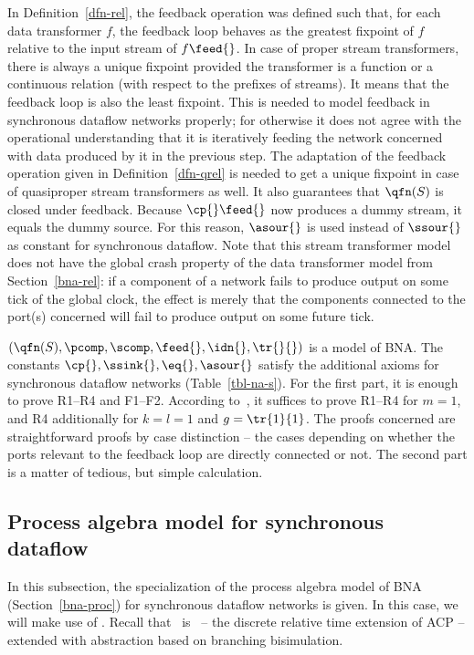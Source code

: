 \documentclass[fleqn]{llncs}
\begin{document}
In Definition~\ref{dfn-rel}, the feedback operation was defined such
that, for each data transformer $f$, the feedback loop behaves as the
greatest fixpoint of $f$ relative to the input stream of $f \feed{}$.
In case of proper stream transformers, there is always a unique
fixpoint provided the transformer is a function or a continuous
relation (with respect to the prefixes of streams).
It means that the feedback loop is also the least fixpoint.
This is needed to model feedback in synchronous dataflow networks
properly; for otherwise it does not agree with the operational
understanding that it is iteratively feeding the network concerned with
data produced by it in the previous step.
The adaptation of the feedback operation given in
Definition~\ref{dfn-qrel} is needed to get a unique fixpoint in
case of quasiproper stream transformers as well.
It also guarantees that $\qfn(S)$ is closed under feedback.
Because $\cp{} \feed{}$ now produces a dummy stream, it equals the
dummy source.
For this reason, $\asour{}$ is used instead of $\ssour{}$ as constant
for synchronous dataflow.
Note that this stream transformer model does not have the global crash
property of the data transformer model from Section~\ref{bna-rel}: if a
component of a network fails to produce output on some tick of the
global clock, the effect is merely that the components connected to the
port(s) concerned will fail to produce output on some future tick.


\bthm
$(\qfn(S),\pcomp,\scomp,\feed{},\idn{},\tr{}{})$ is a model of BNA.
The constants $\cp{},\ssink{},\eq{},\asour{}$ satisfy the additional
axioms for synchronous dataflow networks (Table~\ref{tbl-na-s}).
\ethm
\bproof
For the first part, it is enough to prove R1--R4 and F1--F2.
According to~\cite{CS88,CS89}, it suffices to prove R1--R4 for $m = 1$,
and R4 additionally for $k = l = 1$ and $g = \tr{1}{1}$.
The proofs concerned are straightforward proofs by case distinction --
the cases depending on whether the ports relevant to the feedback loop
are directly connected or not.
The second part is a matter of tedious, but simple calculation.
\eproof

\subsection{Process algebra model for synchronous dataflow}
\label{na-s-sproc}
In this subsection, the specialization of the process algebra model of
BNA (Section~\ref{bna-proc}) for synchronous dataflow networks is given.
In this case, we will make use of \acpdrtt.
Recall that \acpdrtt\ is \acpdrt\ -- the discrete relative time
extension of ACP -- extended with abstraction based on branching
bisimulation.
\end{document}
